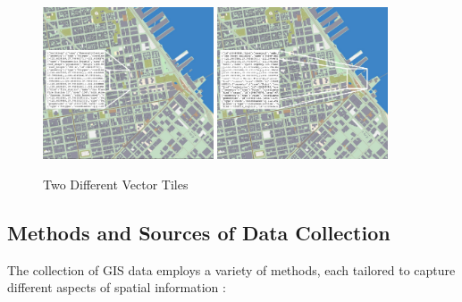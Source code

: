 \documentclass[10pt,oneside,english,a4paper]{article}
\begin{document}
\begin{figure}[h]
	\centering
	\includegraphics[width=0.45\textwidth]{diagram6a.jpg}
	\hfill
	\includegraphics[width=0.45\textwidth]{diagram6b.jpg}
	\caption{Two Different Vector Tiles \cite{Allegri2017}}
	\label{fig:vector}
\end{figure}

\subsection {Methods and Sources of Data Collection} \label{data:sources}

The collection of GIS data employs a variety of methods, each tailored to capture different aspects of spatial information \cite{Demers2008}:
\end{document}
